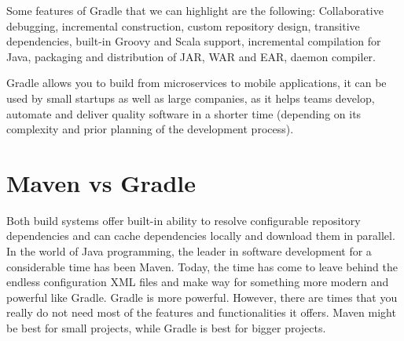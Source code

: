 \documentclass[a4paper,11pt]{article}
\begin{document}
Some features of Gradle that we can highlight are the following: Collaborative 
debugging, incremental construction, custom repository design, transitive 
dependencies, built-in Groovy and Scala support, incremental compilation for 
Java, packaging and distribution of JAR, WAR and EAR, daemon compiler.

Gradle allows you to build from microservices to mobile applications, it can 
be used by small startups as well as large companies, as it helps teams 
develop, automate and deliver quality software in a shorter time (depending on 
its complexity and prior planning of the development process)\cite{GRADLE:1}.

\section{Maven vs Gradle}
Both build systems offer built-in ability to resolve configurable repository 
dependencies and can cache dependencies locally and download them in parallel. 
In the world of Java programming, the leader in software development for a
considerable time has been Maven. Today, the time has come to leave behind the 
endless configuration XML files and make way for something more modern and 
powerful like Gradle. Gradle is more powerful. However, there are times that 
you really do not need most of the features and functionalities it offers. 
Maven might be best for small projects, while Gradle is best for bigger 
projects\cite{DZONE:1}.

\newpage
{}

\end{document}
